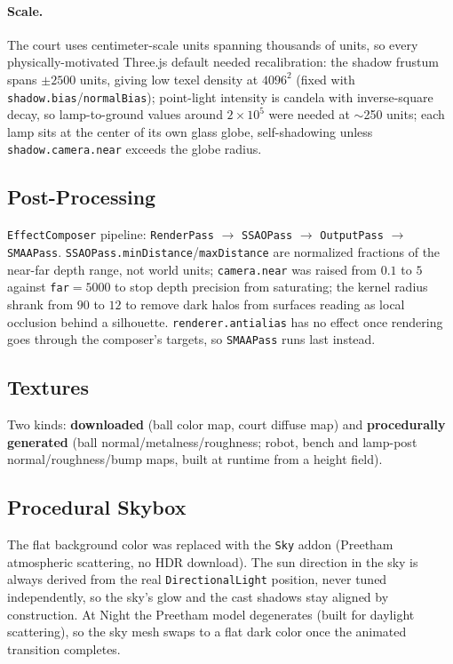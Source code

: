 \documentclass[11pt,a4paper]{article}
\newcommand{\code}[1]{\texttt{#1}}
\begin{document}
\paragraph{Scale.} The court uses centimeter-scale units spanning thousands of units, so every physically-motivated Three.js default needed recalibration: the shadow frustum spans $\pm 2500$ units, giving low texel density at $4096^2$ (fixed with \code{shadow.bias}/\code{normalBias}); point-light intensity is candela with inverse-square decay, so lamp-to-ground values around $2 \times 10^5$ were needed at $\sim$250 units; each lamp sits at the center of its own glass globe, self-shadowing unless \code{shadow.camera.near} exceeds the globe radius.

\subsection{Post-Processing}
\label{sec:postfx}

\code{EffectComposer} pipeline: \code{RenderPass} $\rightarrow$ \code{SSAOPass} $\rightarrow$ \code{OutputPass} $\rightarrow$ \code{SMAAPass}. \code{SSAOPass.minDistance}/\code{maxDistance} are normalized fractions of the near-far depth range, not world units; \code{camera.near} was raised from $0.1$ to $5$ against \code{far}$=5000$ to stop depth precision from saturating; the kernel radius shrank from $90$ to $12$ to remove dark halos from surfaces reading as local occlusion behind a silhouette. \code{renderer.antialias} has no effect once rendering goes through the composer's targets, so \code{SMAAPass} runs last instead.

\subsection{Textures}

Two kinds: \textbf{downloaded} (ball color map, court diffuse map) and \textbf{procedurally generated} (ball normal/metalness/roughness; robot, bench and lamp-post normal/roughness/bump maps, built at runtime from a height field).

\subsection{Procedural Skybox}

The flat background color was replaced with the \code{Sky} addon (Preetham atmospheric scattering, no HDR download). The sun direction in the sky is always derived from the real \code{DirectionalLight} position, never tuned independently, so the sky's glow and the cast shadows stay aligned by construction. At Night the Preetham model degenerates (built for daylight scattering), so the sky mesh swaps to a flat dark color once the animated transition completes.
\end{document}
